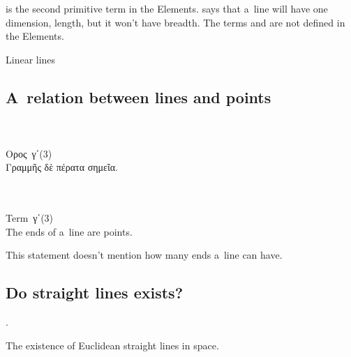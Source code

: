  is the second primitive term in the Elements.
says that a~line will have one dimension, length, but it won’t have breadth.
The terms  and  are not defined in the Elements.

Linear lines

\subsection{A~relation between lines and points}

{\small
\setlength{\parindent}{0pt}

\nopagebreak%
\begin{multicols}{2}
%
\\
\\[.3em]
\textgreek{Ορος}~\textgreek{γ΄}\:(3)\\[.1em]
\textgreek{Γραμμῆς δὲ πέρατα σημεῖα.}

\columnbreak
%
\\
\\[.3em]
Term~\textgreek{γ΄}\:(3)\\[.1em]
The ends of a~line are points.
%
\end{multicols}
\par}

This statement doesn’t mention how many ends a~line can have.

\subsection{Do straight lines exists?}

.

\noindent
The existence of
Euclidean straight lines
in space.

